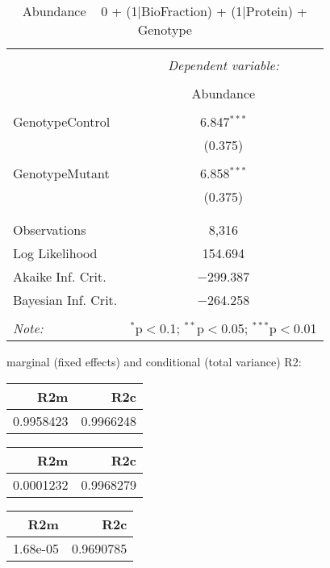\documentclass[11pt]{report}
\begin{document}
\begin{table}[!htbp] \centering 
  \caption{Abundance ~ 0 + (1|BioFraction) + (1|Protein) + Genotype} 
  \label{} 
\begin{tabular}{@{\extracolsep{5pt}}lc} 
\\[-1.8ex]\hline 
\hline \\[-1.8ex] 
 & \multicolumn{1}{c}{\textit{Dependent variable:}} \\ 
\cline{2-2} 
\\[-1.8ex] & Abundance \\ 
\hline \\[-1.8ex] 
 GenotypeControl & 6.847$^{***}$ \\ 
  & (0.375) \\ 
  & \\ 
 GenotypeMutant & 6.858$^{***}$ \\ 
  & (0.375) \\ 
  & \\ 
\hline \\[-1.8ex] 
Observations & 8,316 \\ 
Log Likelihood & 154.694 \\ 
Akaike Inf. Crit. & $-$299.387 \\ 
Bayesian Inf. Crit. & $-$264.258 \\ 
\hline 
\hline \\[-1.8ex] 
\textit{Note:}  & \multicolumn{1}{r}{$^{*}$p$<$0.1; $^{**}$p$<$0.05; $^{***}$p$<$0.01} \\ 
\end{tabular} 
\end{table} 
marginal (fixed effects) and conditional (total variance) R2:

\begin{tabular}{r|r}
\hline
R2m & R2c\\
\hline
0.9958423 & 0.9966248\\
\hline
\end{tabular}

\begin{tabular}{r|r}
\hline
R2m & R2c\\
\hline
0.0001232 & 0.9968279\\
\hline
\end{tabular}

\begin{tabular}{r|r}
\hline
R2m & R2c\\
\hline
1.68e-05 & 0.9690785\\
\hline
\end{tabular}
\end{document}
